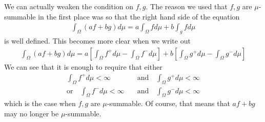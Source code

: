 \begin{rem}[]
  We can actually weaken the condition on $f,g$.
  The reason we used that $f,g$ are $\mu$-summable in the first place was so that the right hand side of the equation
  \begin{align*}
    \int_{\Omega} (af + bg) d \mu = a \int_{\Omega} f d \mu + b \int_{g} f d \mu
  \end{align*}
  is well defined. This becomes more clear when we write out 
      \begin{align*}
        \int_{\Omega} (af+bg) d \mu
        =
        a\left[
          \int_{\Omega} f^{+} d \mu
          - \int_{\Omega} f^{-} d \mu
        \right]
        + b \left[
          \int_{\Omega} g^{+} d \mu
          - \int_{\Omega} g^{-} d \mu
        \right]
      \end{align*}
      We can see that it is enough to require that either
      \begin{align*}
        \int_{\Omega} f^{+} d \mu < \infty \quad &\text{and} \quad  
        \int_{\Omega} g^{+} d \mu < \infty\\
        \text{or}\quad
        \int_{\Omega} f^{-} d \mu < \infty \quad &\text{and} \quad  
        \int_{\Omega} g^{-} d \mu < \infty
      \end{align*}
      which is the case when $f,g$ are $\mu$-summable.
      Of course, that means that $af + bg$ may no longer be $\mu$-summable.
\end{rem}


